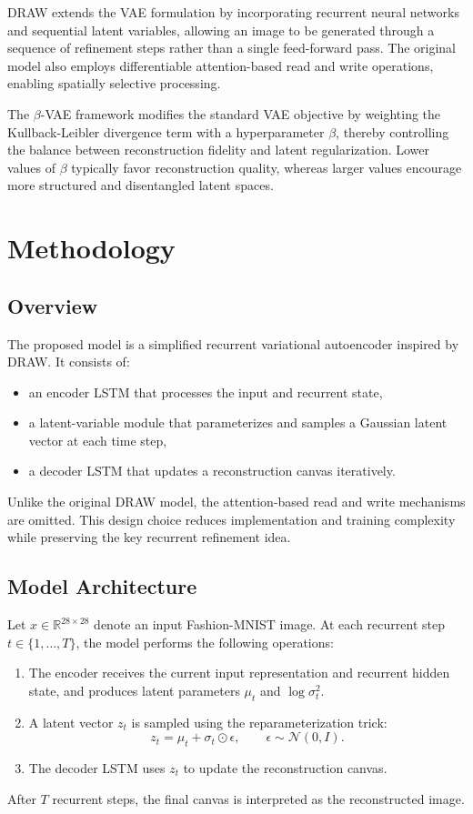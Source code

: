 \documentclass[11pt,a4paper]{article}
\begin{document}
DRAW \citep{gregor2015} extends the VAE formulation by incorporating recurrent neural networks and sequential latent variables, allowing an image to be generated through a sequence of refinement steps rather than a single feed-forward pass. The original model also employs differentiable attention-based read and write operations, enabling spatially selective processing.

The $\beta$-VAE framework \citep{higgins2017} modifies the standard VAE objective by weighting the Kullback-Leibler divergence term with a hyperparameter $\beta$, thereby controlling the balance between reconstruction fidelity and latent regularization. Lower values of $\beta$ typically favor reconstruction quality, whereas larger values encourage more structured and disentangled latent spaces.
\section{Methodology}
\subsection{Overview}
The proposed model is a simplified recurrent variational autoencoder inspired by DRAW. It consists of:
\begin{itemize}
    \item an encoder LSTM that processes the input and recurrent state,
    \item a latent-variable module that parameterizes and samples a Gaussian latent vector at each time step,
    \item a decoder LSTM that updates a reconstruction canvas iteratively.
\end{itemize}
Unlike the original DRAW model, the attention-based read and write mechanisms are omitted. This design choice reduces implementation and training complexity while preserving the key recurrent refinement idea.
\subsection{Model Architecture}
Let $x \in \mathbb{R}^{28 \times 28}$ denote an input Fashion-MNIST image. At each recurrent step $t \in \{1,\dots,T\}$, the model performs the following operations:
\begin{enumerate}
    \item The encoder receives the current input representation and recurrent hidden state, and produces latent parameters $\mu_t$ and $\log \sigma_t^2$.
    \item A latent vector $z_t$ is sampled using the reparameterization trick:
    \[
    z_t = \mu_t + \sigma_t \odot \epsilon, \qquad \epsilon \sim \mathcal{N}(0, I).
    \]
    \item The decoder LSTM uses $z_t$ to update the reconstruction canvas.
\end{enumerate}
After $T$ recurrent steps, the final canvas is interpreted as the reconstructed image.
\end{document}
